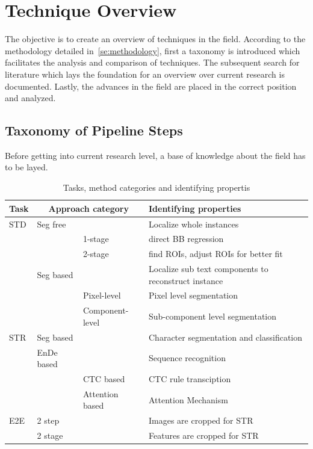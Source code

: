 \chapter{Technique Overview}\label{ch:research}
The objective is to create an overview of techniques in the field.
According to the methodology detailed in~\ref{se:methodology}, first a taxonomy is introduced
which facilitates the analysis and comparison of techniques.
The subsequent search for literature which lays the foundation for an overview over current research
is documented.
Lastly, the advances in the field are placed in the correct position and analyzed.

\section{Taxonomy of Pipeline Steps}
Before getting into current research level, a base of knowledge about the field has to be layed.
\begin{table}[h]
    \centering\scriptsize
    \begin{tabular}{p{}p{}p{}p{}}
        Task & \multicolumn{2}{c}{Approach category} & Identifying properties \\
        \toprule
        STD & Seg free & & Localize whole instances  \\
            & & 1-stage & direct \ac{BB} regression \\
            & & 2-stage & find \acp{ROI}, adjust \acp{ROI} for better fit \\
            & Seg based & & Localize sub text components to reconstruct instance \\
            & & Pixel-level & Pixel level segmentation \\
            & & Component-level & Sub-component level segmentation \\
        \midrule
        STR & Seg based & & Character segmentation and classification\\
            & \ac{EnDe} based & & Sequence recognition \\
            & & CTC based & CTC rule transciption \\
            & & Attention based & Attention Mechanism \\
        \midrule
        E2E & 2 step & & Images are cropped for STR \\
            & 2 stage & & Features are cropped for STR \\
        \bottomrule
    \end{tabular}
    \caption{Tasks, method categories and identifying propertis\label{tb:steps-properties}}
\end{table}
